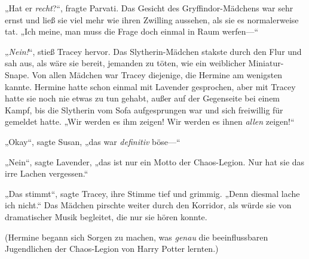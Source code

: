 „Hat er \emph{recht}?“, fragte Parvati. Das Gesicht des Gryffindor-Mädchens war sehr ernst und ließ sie viel mehr wie ihren Zwilling aussehen, als sie es normalerweise tat. „Ich meine, man muss die Frage doch einmal in Raum werfen—“

„\emph{Nein!}“, stieß Tracey hervor. Das Slytherin-Mädchen stakste durch den Flur und sah aus, als wäre sie bereit, jemanden zu töten, wie ein weiblicher Miniatur-Snape. Von allen Mädchen war Tracey diejenige, die Hermine am wenigsten kannte. Hermine hatte schon einmal mit Lavender gesprochen, aber mit Tracey hatte sie noch nie etwas zu tun gehabt, außer auf der Gegenseite bei einem Kampf, bis die Slytherin vom Sofa aufgesprungen war und sich freiwillig für \SPHEW gemeldet hatte. „Wir werden es ihm zeigen! Wir werden es ihnen \emph{allen} zeigen!“

„Okay“, sagte Susan, „das war \emph{definitiv} böse—“

„Nein“, sagte Lavender, „das ist nur ein Motto der Chaos-Legion. Nur hat sie das irre Lachen vergessen.“

„Das stimmt“, sagte Tracey, ihre Stimme tief und grimmig. „Denn diesmal lache ich nicht.“ Das Mädchen pirschte weiter durch den Korridor, als würde sie von dramatischer Musik begleitet, die nur sie hören konnte.

(Hermine begann sich Sorgen zu machen, was \emph{genau} die beeinflussbaren Jugendlichen der Chaos-Legion von Harry Potter lernten.)

